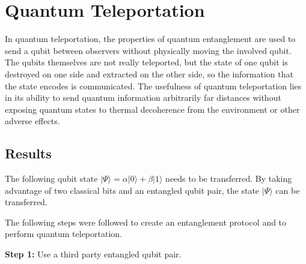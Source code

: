 \chapter{Quantum Teleportation}

In quantum teleportation, the properties of quantum entanglement are used to send a qubit between observers without physically moving the involved qubit. The qubits themselves are not really teleported, but the state of one qubit is destroyed on one side and extracted on the other side, so the information that the state encodes is communicated. The usefulness of quantum teleportation lies in its ability to send quantum information arbitrarily far distances without exposing quantum states to thermal decoherence from the environment or other adverse effects.

\section{Results} \label{sec:teleResults}
The following qubit state  $|\Psi \rangle = \alpha |0 \rangle + \beta |1 \rangle$ needs to be transferred. By taking advantage of two classical bits and an entangled qubit pair, the state $|\Psi \rangle$ can be transferred.

The following steps were followed to create an entanglement protocol and to perform quantum teleportation.

\textbf{Step 1:} Use a third party entangled qubit pair.


